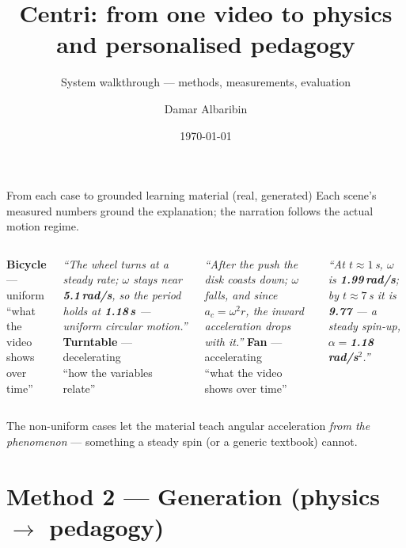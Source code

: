 \documentclass[aspectratio=169,10pt]{beamer}
\title{Centri: from one video to physics and personalised pedagogy}
\subtitle{System walkthrough --- methods, measurements, evaluation}
\author{Damar Albaribin}
\institute{MSc Thesis --- advisor: Prof.\ Wu-Yuin Hwang}
\date{\today}
\newcommand{\hl}[1]{{\bfseries\color{cAccent}#1}}
\begin{document}
\maketitle

\begin{frame}{From each case to grounded learning material (real, generated)}
\scriptsize Each scene's measured numbers ground the explanation; the narration follows the actual motion regime.
\vspace{0.4em}
\begin{columns}[T]
\textbf{\color{cApp}Bicycle} --- uniform\\{\tiny ``what the video shows over time''}
\vspace{2pt}\par
\emph{``The wheel turns at a steady rate; $\omega$ stays near \hl{5.1\,rad/s}, so the period holds at \hl{1.18\,s} --- uniform circular motion.''}
\textbf{\color{cAccent}Turntable} --- decelerating\\{\tiny ``how the variables relate''}
\vspace{2pt}\par
\emph{``After the push the disk coasts down; $\omega$ falls, and since $a_c=\omega^2 r$, the inward acceleration drops with it.''}
\textbf{\color{cPed}Fan} --- accelerating\\{\tiny ``what the video shows over time''}
\vspace{2pt}\par
\emph{``At $t\!\approx\!1$\,s, $\omega$ is \hl{1.99\,rad/s}; by $t\!\approx\!7$\,s it is \hl{9.77} --- a steady spin-up, $\alpha=$\hl{1.18\,rad/s$^2$}.''}
\end{columns}
\vspace{0.5em}
{\scriptsize The non-uniform cases let the material teach angular acceleration \emph{from the phenomenon} --- something a steady spin (or a generic textbook) cannot.}
\end{frame}

\section{Method 2 --- Generation (physics $\rightarrow$ pedagogy)}
\end{document}
